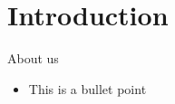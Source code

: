 
\section{Introduction}

\begin{frame}{About us}
    \begin{itemize}
        \item This is a bullet point
    \end{itemize}
\end{frame}

